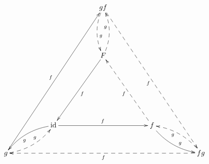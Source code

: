 \documentclass[11pt,a4paper]{article}
\begin{document}
$$
\xy
\xymatrix{
   & & & & gf \ar@{-->}@/_2ex/[dd]^(0.6){g} \ar@{-->}[ddddddrrrr]_{f} 
           & & & & \\
   & & & & & & & & \\ 
   & & & & F \ar[llddd]^{f} \ar@{-->}@/_2ex/[uu]^(0.6){g}
           & & & & \\
   & & & & & & & & \\ 
   & & & &  & & & & \\
   & & {\rm id} \ar[rrrr]^{f} \ar@/_2ex/[lld]^(0.6){g}
       & & & & f \ar@{-->}[lluuu]^{f} \ar@/_2ex/[rrd]^(0.6){g}
               & & \\ 
   g \ar[uuuuuurrrr]^{f} \ar@{-->}@/_2ex/[rru]^(0.6){g}
   & & & & & & & & fg \ar@{-->}[llllllll]^{f} \ar@{-->}@/_2ex/[llu]^(0.6){g}\\ 
}
\endxy
$$
\end{document}

